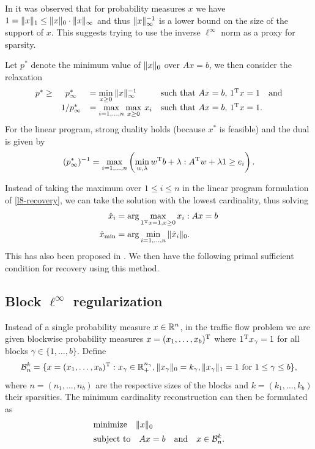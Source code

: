 \documentclass{article} %
\begin{document}
In \cite{mert} it was observed that for probability measures $x$ we have $1 = \lVert x\rVert_1 \leq \lVert x\rVert_0\cdot \lVert x\rVert_\infty$ and thus $\lVert x\rVert_{\infty}^{-1}$ is a lower bound on the size of the support of $x$. This suggests trying to use the inverse $\ell^\infty$ norm as a proxy for sparsity.

Let $p^*$ denote the minimum value of $\lVert x\rVert_0$ over $Ax = b$, we then consider the relaxation
\begin{equation}\label{l8-recovery}
  \begin{array}{rcllllr}
  p^* \geq& p_\infty^* &= \min\limits_{x\geq 0}\, \lVert x\rVert_\infty^{-1}&\text{such that $Ax = b$, $1^{\rm T} x = 1$}\quad \text{and}\\[5pt]
  &1/p_\infty^* &= \max\limits_{i=1,\dots,n} \max\limits_{x\geq 0}\,x_i&\text{such that $Ax = b$, $1^{\rm T} x = 1$.}
  \end{array}
\end{equation}
For the linear program, strong duality holds (because $x^*$ is feasible) and the dual is given by
\begin{equation}\label{l8-recovery-dual}
  (p_\infty^*)^{-1} = \max_{i=1,\dots,n} \left(\min_{w,\lambda} w^{\rm T} b + \lambda : A^{\rm T} w + \lambda 1 \geq e_i\right).
\end{equation}

Instead of taking the maximum over $1\leq i\leq n$ in the linear program formulation of \eqref{l8-recovery}, we can take the solution with the lowest cardinality, thus solving
\begin{align}
\hat{x}_i &= \arg\max_{1^{\rm T} x =1, x\geq 0} x_i : Ax  = b \label{min-cardinality}\\
\hat{x}_{\min} &= \arg\min_{i=1, \dots, n} \|\hat{x}_i\|_0. \nonumber
\end{align}
This has also been proposed in \cite{mert}. We then have the following primal sufficient condition for recovery using this method.


\subsection{Block $\ell^\infty$ regularization}

Instead of a single probability measure $x\in \mathbb{R}^n$, in the traffic
flow problem we are given blockwise probability measures $x = (x_1,
\dots, x_b)^{\rm T}$ where $1^{\rm T} x_\gamma = 1$ for all blocks $\gamma\in
\{1, \dots, b\}$. Define
\begin{equation*}
  \mathcal B_n^k = \{x = (x_1, \dots, x_b)^{\rm T} : x_\gamma \in \mathbb{R}_+^{n_\gamma}, \lVert x_\gamma\rVert_0 = k_\gamma, \lVert x_\gamma\rVert_1 = 1\text{ for $1\leq \gamma\leq b$}\},
\end{equation*}
where $n = (n_1, \dots, n_b)$ are the respective sizes of the blocks
and $k = (k_1, \dots, k_b)$ their sparsities. The minimum cardinality
reconstruction can then be formulated as
\begin{equation}
  \begin{split}
    &\text{minimize}\quad \lVert x\rVert_0\\
    &\text{subject to}\quad Ax = b\quad\text{and}\quad x\in \mathcal B_n^k.
  \end{split}
\end{equation}
\end{document}
